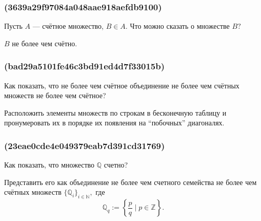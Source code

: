 \documentclass[11pt, a5paper]{article}
\newenvironment{note}[1]{\subsubsection{(#1)}}{}
\newenvironment{cloze}[2][\ldots]{\begin{leftbar}}{\end{leftbar}}
\begin{document}
    \begin{note}{3639a29f97084a048aae918aefdb9100}
        Пусть \( A \) --- счётное множество, \( B \in A. \) Что можно сказать о
        множестве \( B? \)

        \begin{cloze}{1}
            \( B \) не более чем счётно.
        \end{cloze}
    \end{note}

    \begin{note}{bad29a5101fe46c3bd91ed4d7f33015b}
        Как показать, что не более чем счётное объединение не более чем счётных
        множеств не более чем счётное?

        \begin{cloze}{1}
            Расположить элементы множеств по строкам в бесконечную таблицу и
            пронумеровать их в порядке их появления на ``побочных'' диагоналях.
        \end{cloze}
    \end{note}

    \begin{note}{23eae0cde4e049379eab7d391cd31769}
        Как показать, что множество \( \mathbb Q  \) счетно?

        \begin{cloze}{1}
            Представить его как объединение не более чем счетного семейства не
            более чем счётных множеств \( \{ \mathbb Q _i \}_{i \in \mathbb N }
            , \) где \[
                \mathbb Q _q := \left\{ \frac{p}{q} \mid p \in \mathbb Z  \right\}.
            \]
        \end{cloze}
    \end{note}
\end{document}
